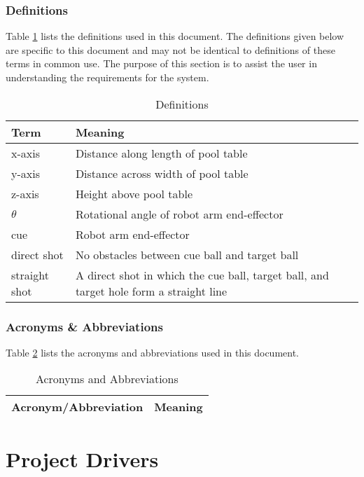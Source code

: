 \documentclass[titlepage]{article}
\begin{document}
  \subsubsection{Definitions}
 Table \ref{tab:Definitions} lists the definitions used in this document. The definitions given below are specific to this document and may not be identical to definitions of these terms in common use. The purpose of this section is to assist the user in understanding the requirements for the system.
 \begin{table}[h!]
 \centering
 \caption{Definitions}
     \begin{tabular}{| p{6cm} | p{6cm} |}\hline
     \textbf{Term}	&\textbf{Meaning}\\\hline
 	x-axis					&Distance along length of pool table\\\hline
 	y-axis					&Distance across width of pool table\\\hline
 	z-axis					&Height above pool table\\\hline
 	$\theta$				&Rotational angle of robot arm end-effector\\\hline
 	cue 					&Robot arm end-effector\\\hline
 	direct shot				&No obstacles between cue ball and target ball\\\hline
 	straight shot			&A direct shot in which the cue ball, target ball, and target hole form a straight line\\\hline
     \end{tabular}
 \label{tab:Definitions}
 \end{table}
 
 \subsubsection{Acronyms \& Abbreviations}
 Table \ref{tab:Acronyms} lists the acronyms and abbreviations used in this document.
 \begin{table}[h!]
 \centering
 \caption{Acronyms and Abbreviations}
     \begin{tabular}{| p{6cm} | p{6cm} |}\hline
     \textbf{Acronym/Abbreviation} &\textbf{Meaning}\\\hline
     \end{tabular}
 \label{tab:Acronyms}
 \end{table}
 
 
 \section{Project Drivers}
\end{document}
